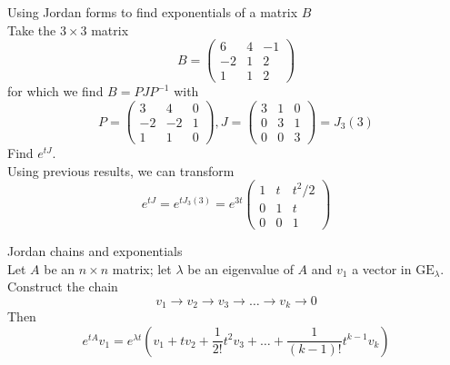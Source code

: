 \documentclass[journal, letterpaper]{IEEEtran}
\begin{document}
    \begin{myboxg}{Using Jordan forms to find exponentials of a matrix $B$} \\ 
        Take the $3 \times 3$ matrix
        $$ B = \begin{pmatrix}
            6 & 4 & -1 \\ -2 & 1 & 2 \\ 1 & 1 & 2
        \end{pmatrix}$$
        for which we find $B = PJP^{-1}$ with
        $$ P = \begin{pmatrix}
            3 & 4 & 0 \\
            -2 & -2 & 1 \\ 
            1 & 1 & 0
        \end{pmatrix}, J = \begin{pmatrix}
            3 & 1 & 0 \\
            0 & 3 & 1 \\
            0 & 0 & 3
        \end{pmatrix} = J_3(3)$$
        Find $e^{tJ}$.
        \newline \\ 
        Using previous results, we can transform
        $$ e^{tJ} = e^{tJ_3(3)} = e^{3t}\begin{pmatrix}
            1 & t & t^2/2 \\ 
            0 & 1 & t \\
            0 & 0 & 1
        \end{pmatrix}$$
    \end{myboxg}
    \begin{mybox}{Jordan chains and exponentials} \\
        Let $A$ be an $n \times n$ matrix; let $\lambda$ be an eigenvalue of $A$ and $v_1$ a vector in $\text{GE}_\lambda$. Construct 
        the chain
        $$ v_1 \to v_2 \to v_3 \to \dots \to v_k \to 0$$
        Then
        $$ e^{tA}v_1 = e^{\lambda t}(v_1 + tv_2 + \frac{1}{2!}t^2v_3 + \dots + \frac{1}{(k-1)!}t^{k-1}v_k)$$
    \end{mybox}
\end{document}
